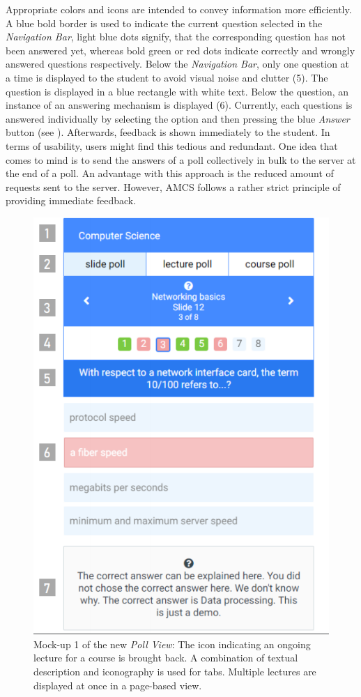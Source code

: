 Appropriate colors and icons are intended to convey information more efficiently. A blue bold border is used to indicate the current question selected in the \emph{Navigation Bar}, light blue dots signify, that the corresponding question has not been answered yet, whereas bold green or red dots indicate correctly and wrongly answered questions respectively. 
Below the \emph{Navigation Bar}, only one question at a time is displayed to the student to avoid visual noise and clutter (5). The question is displayed in a blue rectangle with white text. Below the question, an instance of an answering mechanism is displayed (6). 
Currently, each questions is answered individually by selecting the option and then pressing the blue \emph{Answer} button (see ). Afterwards, feedback is shown immediately to the student. In terms of usability, users might find this tedious and redundant. One idea that comes to mind is to send the answers of a poll collectively in bulk to the server at the end of a poll. An advantage with this approach is the reduced amount of requests sent to the server. However, AMCS follows a rather strict principle of providing immediate feedback.
\begin{figure}
	\begin{center}
		\includegraphics[width=.48\textwidth]{mockups/poll_view_enhancement.png}
	\end{center}
	\captionsetup{format=plain}
	\caption{Mock-up 1 of the new \emph{Poll View}:
		The icon indicating an ongoing lecture for a course is brought back.
		A combination of textual description and iconography is used for tabs.
		Multiple lectures are displayed at once in a page-based view.
	}
	\label{figure:pollviewenhanvement1}
	\vspace*{-0.75cm}
\end{figure}
